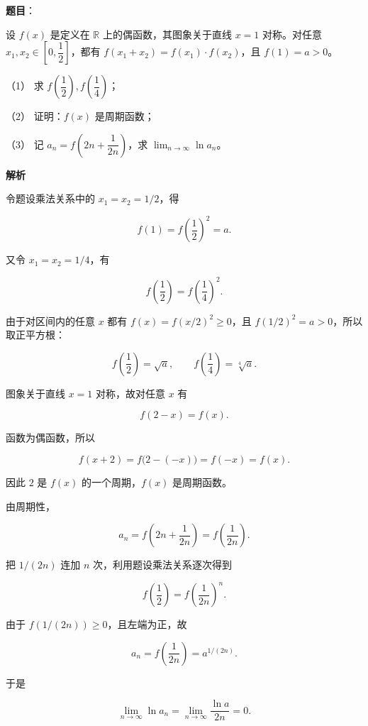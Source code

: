 \begin{answer}

\textbf{题目}：

设 $f(x)$ 是定义在 $\mathbb R$ 上的偶函数，其图象关于直线 $x=1$ 对称。对任意 $x_1,x_2\in\left[0,\dfrac12\right]$，都有 $f(x_1+x_2)=f(x_1)\cdot f(x_2)$，且 $f(1)=a>0$。

（1） 求 $f\left(\dfrac12\right),f\left(\dfrac14\right)$；

（2） 证明：$f(x)$ 是周期函数；

（3） 记 $a_n=f\left(2n+\dfrac1{2n}\right)$，求 $\displaystyle\lim_{n\to\infty}\ln a_n$。

\textbf{解析}


令题设乘法关系中的 $x_1=x_2=1/2$，得

\nopagebreak[4]
\[
f(1)=f\left(\frac12\right)^2=a.
\]

又令 $x_1=x_2=1/4$，有

\nopagebreak[4]
\[
f\left(\frac12\right)=f\left(\frac14\right)^2.
\]

由于对区间内的任意 $x$ 都有 $f(x)=f(x/2)^2\ge0$，且 $f(1/2)^2=a>0$，所以取正平方根：

\nopagebreak[4]
\[
f\left(\frac12\right)=\sqrt a,\qquad
f\left(\frac14\right)=\sqrt[4]{a}.
\]


图象关于直线 $x=1$ 对称，故对任意 $x$ 有

\nopagebreak[4]
\[
f(2-x)=f(x).
\]

函数为偶函数，所以

\nopagebreak[4]
\[
f(x+2)=f\bigl(2-(-x)\bigr)=f(-x)=f(x).
\]

因此 $2$ 是 $f(x)$ 的一个周期，$f(x)$ 是周期函数。


由周期性，

\nopagebreak[4]
\[
a_n=f\left(2n+\frac1{2n}\right)=f\left(\frac1{2n}\right).
\]

把 $1/(2n)$ 连加 $n$ 次，利用题设乘法关系逐次得到

\nopagebreak[4]
\[
f\left(\frac12\right)=f\left(\frac1{2n}\right)^n.
\]

由于 $f(1/(2n))\ge0$，且左端为正，故

\nopagebreak[4]
\[
a_n=f\left(\frac1{2n}\right)=a^{1/(2n)}.
\]

于是

\nopagebreak[4]
\[
\lim_{n\to\infty}\ln a_n
=\lim_{n\to\infty}\frac{\ln a}{2n}=0.
\]




\end{answer}
